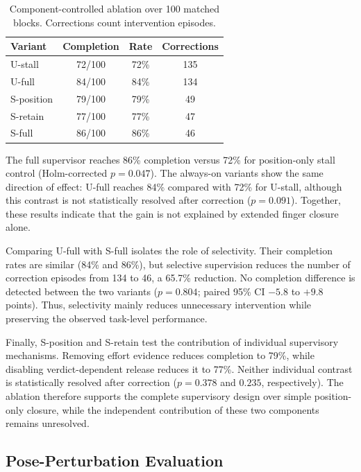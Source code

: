 \documentclass[letterpaper,10pt,conference]{ieeeconf}
\begin{document}
\begin{table}[H]
\caption{Component-controlled ablation over 100 matched blocks. Corrections
count intervention episodes.}
\label{tab:ablations}
\centering\small
\setlength{\tabcolsep}{4pt}
\begin{tabularx}{\columnwidth}{Yccc}
\toprule
Variant & Completion & Rate & Corrections\\
\midrule
U-stall     & 72/100 & 72\% & 135\\
U-full      & 84/100 & 84\% & 134\\
S-position  & 79/100 & 79\% & 49\\
S-retain    & 77/100 & 77\% & 47\\
S-full      & 86/100 & 86\% & 46\\
\bottomrule
\end{tabularx}
\end{table}

The full supervisor reaches 86\% completion versus 72\% for position-only
stall control (Holm-corrected $p=0.047$). The always-on variants show the same
direction of effect: U-full reaches 84\% compared with 72\% for U-stall,
although this contrast is not statistically resolved after correction
($p=0.091$). Together, these results indicate that the gain is not explained
by extended finger closure alone.

Comparing U-full with S-full isolates the role of selectivity. Their completion
rates are similar (84\% and 86\%), but selective supervision reduces the
number of correction episodes from 134 to 46, a 65.7\% reduction. No
completion difference is detected between the two variants
($p=0.804$; paired 95\% CI $-5.8$ to $+9.8$ points). Thus, selectivity mainly
reduces unnecessary intervention while preserving the observed task-level
performance.

Finally, S-position and S-retain test the contribution of individual
supervisory mechanisms. Removing effort evidence reduces completion to 79\%,
while disabling verdict-dependent release reduces it to 77\%. Neither
individual contrast is statistically resolved after correction
($p=0.378$ and $0.235$, respectively). The ablation therefore supports the
complete supervisory design over simple position-only closure, while the
independent contribution of these two components remains unresolved.


\subsection{Pose-Perturbation Evaluation}
\label{sec:pose_stress}
\end{document}

